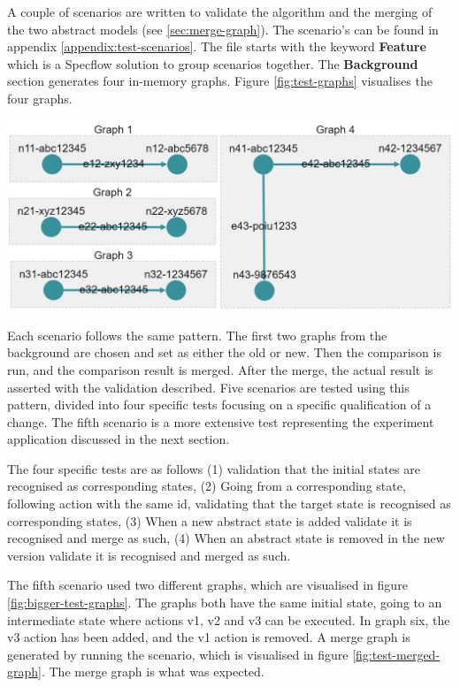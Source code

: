 A couple of scenarios are written to validate the algorithm and the merging of the two abstract models (see \ref{sec:merge-graph}). The scenario's can be found in appendix \ref{appendix:test-scenarios}. The file starts with the keyword \textbf{Feature} which is a Specflow solution to group scenarios together. The \textbf{Background} section generates four in-memory graphs. Figure \ref{fig:test-graphs} visualises the four graphs. 

\begingroup
\captionsetup{type=figure}
\includegraphics[scale=0.6]{images/6-TestGraphs.png}
\label{fig:test-graphs}
\endgroup

Each scenario follows the same pattern. The first two graphs from the background are chosen and set as either the old or new. Then the comparison is run, and the comparison result is merged. After the merge, the actual result is asserted with the validation described. Five scenarios are tested using this pattern, divided into four specific tests focusing on a specific qualification of a change. The fifth scenario is a more extensive test representing the experiment application discussed in the next section.

The four specific tests are as follows (1) validation that the initial states are recognised as corresponding states, (2) Going from a corresponding state, following action with the same id, validating that the target state is recognised as corresponding states, (3) When a new abstract state is added validate it is recognised and merge as such, (4) When an abstract state is removed in the new version validate it is recognised and merged as such.

The fifth scenario used two different graphs, which are visualised in figure \ref{fig:bigger-test-graphs}. The graphs both have the same initial state, going to an intermediate state where actions v1, v2 and v3 can be executed. In graph six, the v3 action has been added, and the v1 action is removed. A merge graph is generated by running the scenario, which is visualised in figure \ref{fig:test-merged-graph}. The merge graph is what was expected. 

